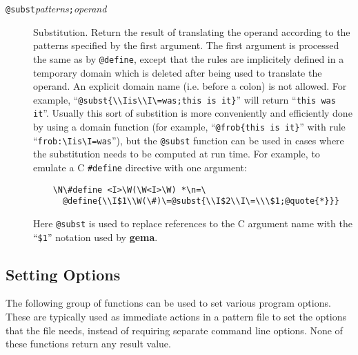 \begin{description}
\item[{\tt @subst\ttlb}{\it patterns}{\tt ;}{\it operand}{\tt \ttrb}]
Substitution.
Return the result of translating the operand according to the patterns
specified by the first argument.
The first argument is processed the same as by \verb/@define/, except
that the rules are implicitely defined in a temporary domain which is
deleted after being used to translate the operand.  An explicit domain
name (i.e. before a colon) is not allowed.
For example, ``\verb/@subst{\\Iis\\I\=was;this is it}/'' will return
``\verb/this was it/''.
Usually this sort of substition is more conveniently and efficiently
done by using a domain function (for example, ``\verb/@frob{this is it}/''
with rule ``\verb/frob:\Iis\I=was/''), but the \verb/@subst/ function
can be used in cases where the substitution needs to be computed at run
time.
For example, to emulate a C \verb/#define/ directive with one argument:
\begin{verbatim}
    \N\#define <I>\W(\W<I>\W) *\n=\
      @define{\\I$1\\W(\#)\=@subst{\\I$2\\I\=\\\$1;@quote{*}}}
\end{verbatim}
Here \verb/@subst/ is used to replace references to the C argument name
with the ``\verb/$1/'' notation used by {\bf gema}.
\end{description}

\subsection{Setting Options}
The following group of functions can be used to set various program
options.  These are typically used as immediate actions in a pattern
file to set the options that the file needs, instead of requiring
separate command line options.  None of these functions return any
result value.

